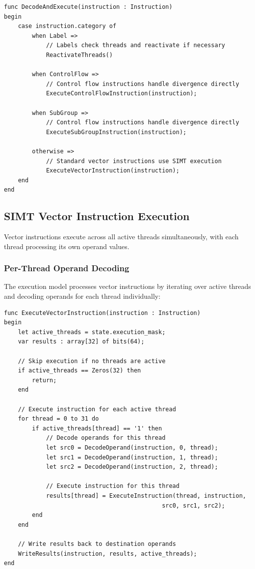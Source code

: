 \begin{lstlisting}[caption={Instruction Classification and Dispatch}, label={lst:instruction_dispatch}]
func DecodeAndExecute(instruction : Instruction)
begin
    case instruction.category of
        when Label =>
            // Labels check threads and reactivate if necessary
            ReactivateThreads()
            
        when ControlFlow =>
            // Control flow instructions handle divergence directly
            ExecuteControlFlowInstruction(instruction);

        when SubGroup =>
            // Control flow instructions handle divergence directly
            ExecuteSubGroupInstruction(instruction);
            
        otherwise =>
            // Standard vector instructions use SIMT execution
            ExecuteVectorInstruction(instruction);
    end
end
\end{lstlisting}


\subsection{SIMT Vector Instruction Execution}
\label{subsec:vector_execution}

Vector instructions execute across all active threads simultaneously, with each
thread processing its own operand values.

\subsubsection{Per-Thread Operand Decoding}
The execution model processes vector instructions by iterating over active
threads and decoding operands for each thread individually:

\begin{lstlisting}[caption={SIMT Vector Instruction Processing}, label={lst:vector_processing}]
func ExecuteVectorInstruction(instruction : Instruction)
begin
    let active_threads = state.execution_mask;
    var results : array[32] of bits(64);
    
    // Skip execution if no threads are active
    if active_threads == Zeros(32) then
        return;
    end
    
    // Execute instruction for each active thread
    for thread = 0 to 31 do
        if active_threads[thread] == '1' then
            // Decode operands for this thread
            let src0 = DecodeOperand(instruction, 0, thread);
            let src1 = DecodeOperand(instruction, 1, thread);
            let src2 = DecodeOperand(instruction, 2, thread);
            
            // Execute instruction for this thread
            results[thread] = ExecuteInstruction(thread, instruction, 
                                             src0, src1, src2);
        end
    end
    
    // Write results back to destination operands
    WriteResults(instruction, results, active_threads);
end
\end{lstlisting}

